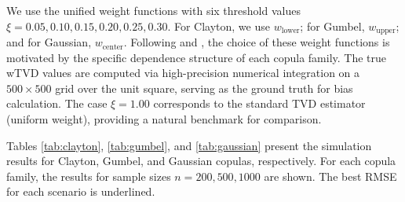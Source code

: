 \documentclass[twoside]{article}
\begin{document}
We use the unified weight functions with six threshold values $\xi = 0.05, 0.10, 0.15, 0.20, 0.25, 0.30$. For Clayton, we use $w_{\text{lower}}$; for Gumbel, $w_{\text{upper}}$; and for Gaussian, $w_{\text{center}}$. Following \cite{Krupskii2015} and \cite{Hudaverdi2020}, the choice of these weight functions is motivated by the specific dependence structure of each copula family. The true wTVD values are computed via high-precision numerical integration on a $500 \times 500$ grid over the unit square, serving as the ground truth for bias calculation. The case $\xi = 1.00$ corresponds to the standard TVD estimator (uniform weight), providing a natural benchmark for comparison.

Tables \ref{tab:clayton}, \ref{tab:gumbel}, and \ref{tab:gaussian} present the simulation results for Clayton, Gumbel, and Gaussian copulas, respectively. For each copula family, the results for sample sizes $n = 200, 500, 1000$ are shown. The best RMSE for each scenario is underlined.
\end{document}
